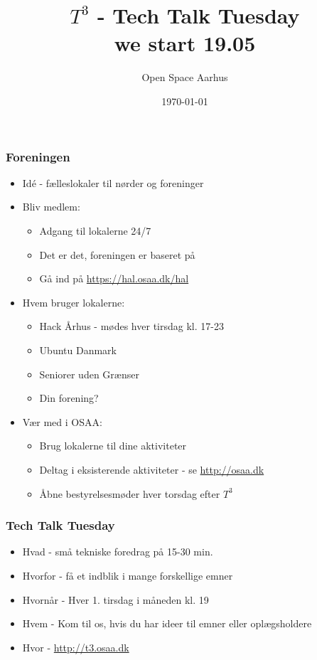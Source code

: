 \documentclass{beamer}
\title[${T^3}$ - Tech Talk Tuesday]{${T^3}$ - Tech Talk Tuesday \\
we start 19.05 }
\author{Open Space Aarhus}
\date{\today}
\institute[Katrinebjergvej 105]{Katrinebjergvej 105, 8200 Aarhus N}
\begin{document}
\begin{frame}[label=titlepage]
  \titlepage
\end{frame}

\begin{frame}
  \frametitle{Foreningen}
  \begin{itemize}
  \item Idé - fælleslokaler til nørder og foreninger
  \item Bliv medlem:
    \begin{itemize}
    \item Adgang til lokalerne 24/7
    \item Det er det, foreningen er baseret på
    \item Gå ind på  \url{https://hal.osaa.dk/hal}
    \end{itemize}
  \item Hvem bruger lokalerne:
    \begin{itemize}
    \item Hack Århus - mødes hver tirsdag kl. 17-23
    \item Ubuntu Danmark
    \item Seniorer uden Grænser
    \item Din forening?
    \end{itemize}
  \item Vær med i OSAA:
    \begin{itemize}
    \item Brug lokalerne til dine aktiviteter
    \item Deltag i eksisterende aktiviteter - se \url{http://osaa.dk}
    \item Åbne bestyrelsesmøder hver torsdag efter ${T^3}$
    \end{itemize}
  \end{itemize}
\end{frame}

\begin{frame}
  \frametitle{Tech Talk Tuesday}
  \begin{itemize}
  \item Hvad - små tekniske foredrag på 15-30 min.
  \item Hvorfor - få et indblik i mange forskellige emner
  \item Hvornår - Hver 1. tirsdag i måneden kl. 19
  \item Hvem - Kom til os, hvis du har ideer til emner eller oplægsholdere
  \item Hvor - \url{http://t3.osaa.dk}
  \end{itemize}
\end{frame}
\end{document}
